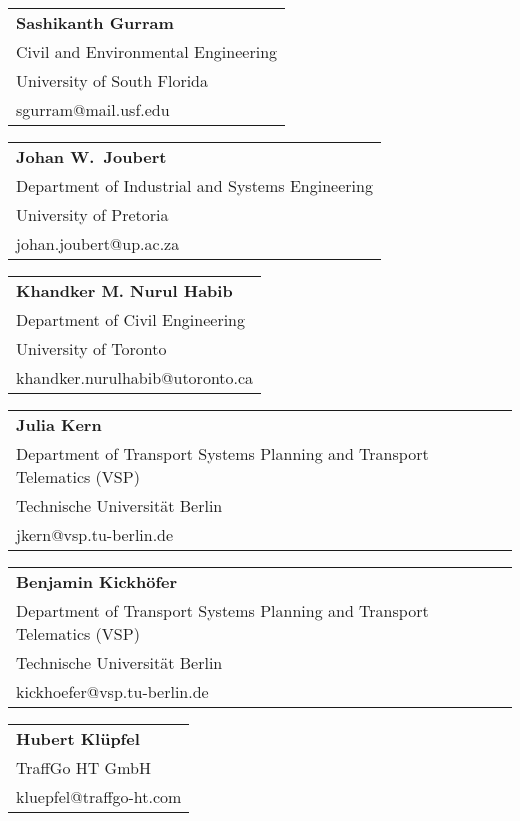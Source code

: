 \begin{tabular}[width=0.48\textwidth]{l}
\textbf{Sashikanth Gurram} \\
Civil and Environmental Engineering \\
University of South Florida \\
sgurram@mail.usf.edu \\
\end{tabular}

\begin{tabular}[width=0.48\textwidth]{l}
\textbf{Johan W.\ Joubert} \\
Department of Industrial and Systems Engineering \\
University of Pretoria \\
johan.joubert@up.ac.za  \\
\end{tabular}

\begin{tabular}[width=0.48\textwidth]{l}
\textbf{Khandker M. Nurul Habib} \\
Department of Civil Engineering \\
University of Toronto \\
khandker.nurulhabib@utoronto.ca  \\
\end{tabular}

\begin{tabular}[width=0.48\textwidth]{l}
\textbf{Julia Kern} \\
Department of Transport Systems Planning and Transport Telematics (VSP) \\
Technische Universität Berlin \\
jkern@vsp.tu-berlin.de \\
\end{tabular}

\begin{tabular}[width=0.48\textwidth]{l}
\textbf{Benjamin Kickhöfer} \\
Department of Transport Systems Planning and Transport Telematics (VSP) \\
Technische Universität Berlin \\
kickhoefer@vsp.tu-berlin.de \\
\end{tabular}

\begin{tabular}[width=0.48\textwidth]{l}
\textbf{Hubert Klüpfel} \\
TraffGo HT GmbH\\
kluepfel@traffgo-ht.com \\
\end{tabular}

